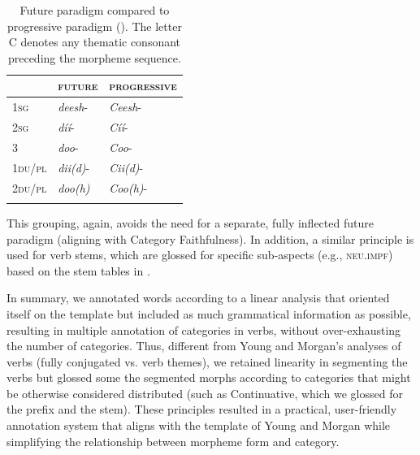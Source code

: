 \begin{enumerate}
    \begin{table}
        \caption{Future paradigm compared to progressive paradigm (\cite[907,910]{Young:1992bd}). The letter C denotes any thematic consonant preceding the morpheme sequence.}
        \label{tab:placeholder}
        \begin{tabularx}{.6\linewidth}{XXX}
            \lsptoprule
            &\textsc{future}&\textsc{progressive}\\
            \midrule
            1\textsc{sg}&\textit{deesh}-&\textit{Ceesh}-\\
            2\textsc{sg}&\textit{díí}-&\textit{Cíí}-\\
            3&\textit{doo}-&\textit{Coo}-\\
            1\textsc{du}/\textsc{pl}&\textit{dii(d)}-&\textit{Cii(d)}-\\
            2\textsc{du}/\textsc{pl}&\textit{doo(h)}&\textit{Coo(h)}-\\
            \lspbottomrule
        \end{tabularx}
    \end{table}

    This grouping, again, avoids the need for a separate, fully inflected future paradigm (aligning with Category Faithfulness). In addition, a similar principle is used for verb stems, which are glossed for specific sub-aspects (e.g., \textsc{neu}.\textsc{impf}) based on the stem tables in \citet{Young:1992bd}.

\end{enumerate}

In summary, we annotated words according to a linear analysis that oriented itself on the template but included as much grammatical information as possible, resulting in multiple annotation of categories in verbs, without over-exhausting the number of categories. Thus, different from Young and Morgan's analyses of verbs (fully conjugated vs. verb themes), we retained linearity in segmenting the verbs but glossed some the segmented morphs according to categories that might be otherwise considered distributed (such as Continuative, which we glossed for the prefix and the stem). These principles resulted in a practical, user-friendly annotation system that aligns with the template of Young and Morgan while simplifying the relationship between morpheme form and category.

